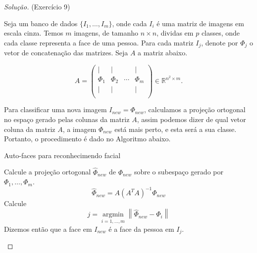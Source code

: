\documentclass[a4paper,10pt]{article}
\newenvironment{solution}
  {\begin{proof}[Solução]}
  {\end{proof}}
\newcommand{\norm}[1]{\left\lVert#1\right\rVert}
\DeclareMathOperator{\argmin}{argmin}
\begin{document}
  \begin{solution}{(Exercício 9)}

    Seja um banco de dados $\{I_1, \dots, I_m\}$, onde cada $I_i$ é uma
    matriz de imagens em escala cinza. Temos $m$ imagens, de tamanho
    $n\times n$, dividas em $p$ classes, onde cada classe representa a face de uma pessoa.
    Para cada matriz $I_j$, denote por $\Phi_j$ o vetor de concatenação
    das matrizes. Seja $A$ a matriz abaixo.

    \begin{equation*}
      A =
      \begin{pmatrix}
        \vert  & \vert  &        & \vert  \\
        \Phi_1 & \Phi_2 & \cdots & \Phi_m \\
        \vert  & \vert  &        & \vert  \\
      \end{pmatrix}
      \in \mathbb{R}^{n^2 \times m}.
    \end{equation*}

    Para classificar uma nova imagem $I_{new} = \Phi_{new}$, calculamos a
    projeção ortogonal no espaço gerado pelas colunas da matriz $A$, assim
    podemos dizer de qual vetor coluna da matriz $A$, a imagem $\Phi_{new}$
    está mais perto, e esta será a sua classe.
    Portanto, o procedimento é dado no Algoritmo abaixo.

    \begin{algorithm}[htb]
        \caption{Auto-faces para reconhecimendo facial}
        \begin{algorithmic}[1]
            \State Calcule a projeção ortogonal $\hat{\Phi}_{new}$ de $\Phi_{new}$
                    sobre o subespaço gerado por $\Phi_1, \dots, \Phi_m$.
                    \begin{equation*}
                      \hat{\Phi}_{new} = A(A^TA)^{-1}\Phi_{new}
                    \end{equation*}
            \State Calcule
                    \begin{equation*}
                      j = \underset{i=1,\dots,m}{\argmin} \norm{\hat{\Phi}_{new} -
                      \Phi_i}
                    \end{equation*}
            \State Dizemos então que a face em $I_{new}$ é a face da pessoa em
            $I_j$.
        \end{algorithmic}
    \end{algorithm}

  \end{solution}
\end{document}
